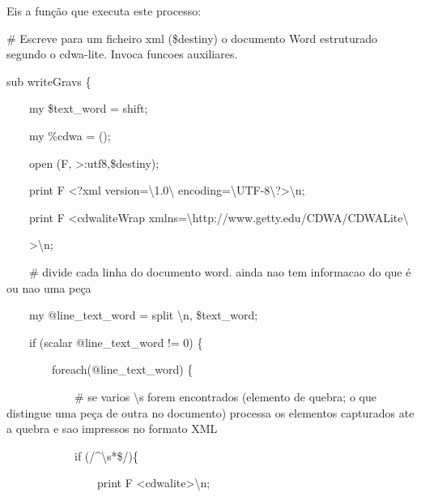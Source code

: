 \documentclass[letterpaper]{article}
\begin{document}
{
Eis a fun\c{c}\~ao que executa este processo:}

{
\# Escreve para um ficheiro xml (\$destiny) o documento Word estruturado
segundo o cdwa-lite. Invoca funcoes auxiliares. }

{
sub writeGravs \{ }

{
\ \ \ \ my \$text\_word = shift; }

{
\ \ \ \ my \%cdwa = (); }


\bigskip

{
\ \ \ \ open (F,
{\textquotedbl}{\textgreater}:utf8{\textquotedbl},\$destiny); }

{
\ \ \ \ print F {\textquotedbl}{\textless}?xml
version={\textbackslash}{\textquotedbl}1.0{\textbackslash}{\textquotedbl}
encoding={\textbackslash}{\textquotedbl}UTF-8{\textbackslash}{\textquotedbl}?{\textgreater}{\textbackslash}n{\textquotedbl};
}

{
\ \ \ \ print F {\textquotedbl}{\textless}cdwaliteWrap
xmlns={\textbackslash}{\textquotedbl}http://www.getty.edu/CDWA/CDWALite{\textbackslash}{\textquotedbl}
}

{
\ \ \ \ {\textgreater}{\textbackslash}n{\textquotedbl}; }


\bigskip

{
\ \ \ \ \# divide cada linha do documento word. ainda nao tem informacao
do que \'e ou nao uma pe\c{c}a }

{
\ \ \ \ my @line\_text\_word = split
{\textquotedbl}{\textbackslash}n{\textquotedbl}, \$text\_word; }

{
\ \ \ \ if (scalar @line\_text\_word != 0) \{ }

{
\ \ \ \ \ \ \ \ foreach(@line\_text\_word) \{ }

{
\ \ \ \ \ \ \ \ \ \ \ \ \# se varios {\textbackslash}s forem encontrados
(elemento de quebra; o que distingue uma pe\c{c}a de outra no
documento) processa os elementos capturados ate a quebra e sao
impressos no formato XML }

{
\ \ \ \ \ \ \ \ \ \ \ \ if (/\^{}{\textbackslash}s*\$/)\{ }

{
\ \ \ \ \ \ \ \ \ \ \ \ \ \ \ \ print F
{\textquotedbl}{\textless}cdwalite{\textgreater}{\textbackslash}n{\textquotedbl};
}
\end{document}
